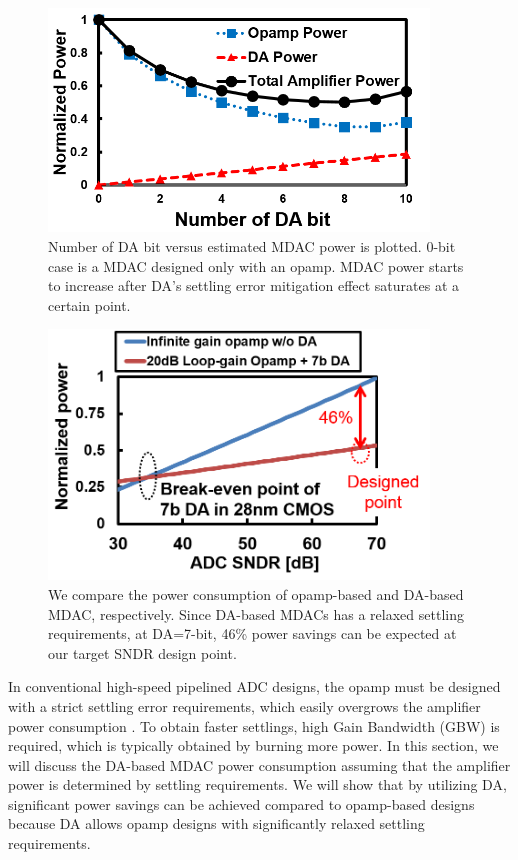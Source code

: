 \begin{figure}[!]
\centering
  \includegraphics[width=0.9\textwidth]{figure/chap2/da-vs-opamp.png}
  \caption{Number of DA bit versus estimated MDAC power is plotted. 0-bit case is a MDAC designed only with an opamp. MDAC power starts to increase after DA's settling error mitigation effect saturates at a certain point.}
  \label{fig-amp-chara2}
\end{figure}
\begin{figure}[!]
\centering
  \includegraphics[width=0.9\textwidth]{figure/chap2/power-vs-sndr-analysis.png}
  \caption{
  We compare the power consumption of opamp-based and DA-based MDAC, respectively. Since DA-based MDACs has a relaxed settling requirements, at DA=7-bit, 46\% power savings can be expected at our target SNDR design point.}
  \label{fig-power-sndr-analysis}
\end{figure}

In conventional high-speed pipelined ADC designs, the opamp must be designed with a strict settling error requirements, which easily overgrows the amplifier power consumption \cite{chai20125}. To obtain faster settlings, high Gain Bandwidth (GBW) is required, which is typically obtained by burning more power. 
In this section, we will discuss the DA-based MDAC power consumption assuming that the amplifier power is determined by settling requirements. We will show that by utilizing DA, significant power savings can be achieved compared to opamp-based designs because DA allows opamp designs with significantly relaxed settling requirements.

